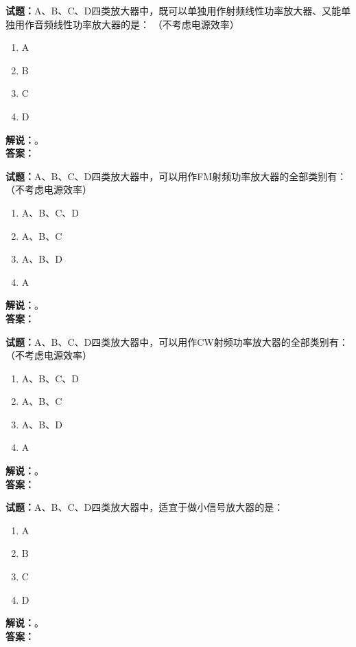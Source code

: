 \documentclass{ctexbook}
\begin{document}
\vspace{\baselineskip}

\noindent\textbf{试题：}A、B、C、D四类放大器中，既可以单独用作射频线性功率放大器、又能单独用作音频线性功率放大器的是： （不考虑电源效率）
\begin{enumerate}[leftmargin=3em]
  \item A
  \item B
  \item C
  \item D
\end{enumerate}
\noindent\textbf{解说：}\textbf{}。\\\noindent\textbf{答案：}

\vspace{\baselineskip}

\noindent\textbf{试题：}A、B、C、D四类放大器中，可以用作FM射频功率放大器的全部类别有： （不考虑电源效率）
\begin{enumerate}[leftmargin=3em]
  \item A、B、C、D
  \item A、B、C
  \item A、B、D
  \item A
\end{enumerate}
\noindent\textbf{解说：}\textbf{}。\\\noindent\textbf{答案：}

\vspace{\baselineskip}

\noindent\textbf{试题：}A、B、C、D四类放大器中，可以用作CW射频功率放大器的全部类别有： （不考虑电源效率）
\begin{enumerate}[leftmargin=3em]
  \item A、B、C、D
  \item A、B、C
  \item A、B、D
  \item A
\end{enumerate}
\noindent\textbf{解说：}\textbf{}。\\\noindent\textbf{答案：}

\vspace{\baselineskip}

\noindent\textbf{试题：}A、B、C、D四类放大器中，适宜于做小信号放大器的是：
\begin{enumerate}[leftmargin=3em]
  \item A
  \item B
  \item C
  \item D
\end{enumerate}
\noindent\textbf{解说：}\textbf{}。\\\noindent\textbf{答案：}
\end{document}
